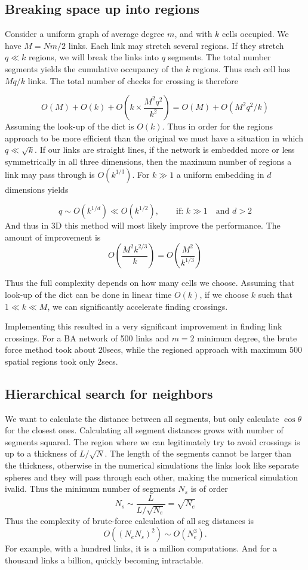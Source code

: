 \documentclass[nofootinbib,preprint,floatfix,titlepage,endfloats,superscriptaddress]{revtex4} %
\begin{document}
\subsection{Breaking space up into regions}
Consider a uniform graph of average degree $m$, and with $k$ cells occupied. We have $M = Nm/2$ links. Each link may stretch several regions. If they stretch $q \ll k $ regions, we will break the links into $q$ segments. The total number segments yields the cumulative occupancy of the $k$ regions. Thus each cell has $Mq/k$ links. The total number of checks for crossing is therefore


$$ O(M) + O(k)+ O\left( k \times \frac{M^2 q^2 }{ k^2} \right)= O(M)+ O(M^2 q^2/k) $$
Assuming the look-up of the dict is $O(k)$. Thus in order for the regions approach to be more efficient than the original we must have a situation in which $q \ll \sqrt{k}$. If our links are straight lines, if the network is embedded more or less symmetrically in all three dimensions, then the maximum number of regions a link may pass through is $O(k^{1/3})$. For $k \gg 1$ a uniform embedding in $d$ dimensions yields 

$$ q \sim O(k^{1/d}) \ll O(k^{1/2}), \qquad \mbox{if: } k\gg1 \quad \mbox{and } d> 2$$ 
And thus in 3D this method will most likely improve the performance. The amount of improvement is
$$ O\left( \frac{M^2 k^{2/3} }{ k} \right) = O\left(\frac{M^2}{ k^{1/3}} \right) $$

Thus the full complexity depends on how many cells we choose. Assuming that look-up of the dict can be done in linear time $O(k)$, if we choose $ k$ such that $1\ll k \ll M$, we can significantly accelerate finding crossings.  

Implementing this resulted in a very significant improvement in finding link crossings. For a BA network of 500 links and $m=2$ minimum degree, the brute force method took about 20secs, while the regioned approach with maximum 500 spatial regions took only 2secs. 

\subsection{ Hierarchical search for neighbors}
We want to calculate the distance between all segments, but only calculate $\cos\theta$ for the closest ones. Calculating all segment distances grows with number of segments squared. The region where we can legitimately try to avoid crossings is up to a thickness of $L/\sqrt{N}$. The length of the segments cannot be larger than the thickness, otherwise in the numerical simulations the links look like separate spheres and they will pass through each other, making the numerical simulation ivalid. Thus the minimum number of segments $N_s$ is of order
$$ N_s\sim \frac{L}{L/\sqrt{N_e}} = \sqrt{N_e} $$
Thus the complexity of brute-force calculation of all seg distances is 
$$ O((N_e N_s)^2) \sim O(N_e^3). $$  
For example, with a hundred links, it is a million computations. And for a thousand links a billion, quickly becoming intractable. 

\newpage
\end{document}
